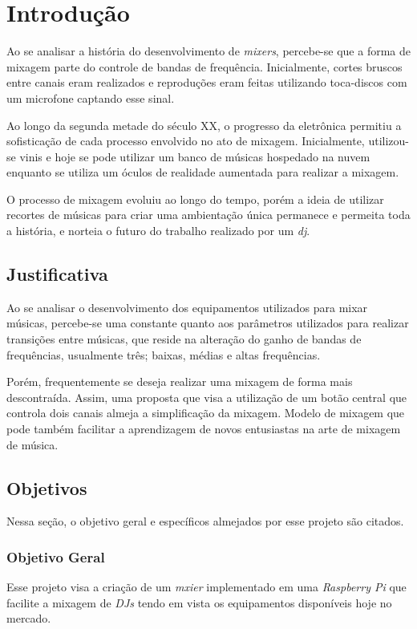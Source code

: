 \chapter[Introdução]{Introdução}

Ao se analisar a história do desenvolvimento de \textit{mixers}, percebe-se que a forma de mixagem parte do controle de bandas de frequência. Inicialmente, cortes bruscos entre canais eram realizados e reproduções eram feitas utilizando toca-discos com um microfone captando esse sinal. 

Ao longo da segunda metade do século XX, o progresso da eletrônica permitiu a sofisticação de cada processo envolvido no ato de mixagem. Inicialmente, utilizou-se vinis e hoje se pode utilizar um banco de músicas hospedado na nuvem enquanto se utiliza um óculos de realidade aumentada para realizar a mixagem. 

O processo de mixagem evoluiu ao longo do tempo, porém a ideia de utilizar recortes de músicas para criar uma ambientação única permanece e permeita toda a história, e norteia o futuro do trabalho realizado por um \textit{dj}.

\section{Justificativa}
Ao se analisar o desenvolvimento dos equipamentos utilizados para mixar músicas, percebe-se uma constante quanto aos parâmetros utilizados para realizar transições entre músicas, que reside na alteração do ganho de bandas de frequências, usualmente três; baixas, médias e altas frequências.

Porém, frequentemente se deseja realizar uma mixagem de forma mais descontraída. Assim, uma proposta que visa a utilização de um botão central que controla dois canais almeja a simplificação da mixagem. Modelo de mixagem que pode também facilitar a aprendizagem de novos entusiastas na arte de mixagem de música.
\section{Objetivos}

Nessa seção, o objetivo geral e específicos almejados por esse projeto são citados.

\subsection{Objetivo Geral}
Esse projeto visa a criação de um \textit{mxier} implementado em uma \textit{Raspberry Pi} que facilite a mixagem de \textit{DJs} tendo em vista os equipamentos disponíveis hoje no mercado.

